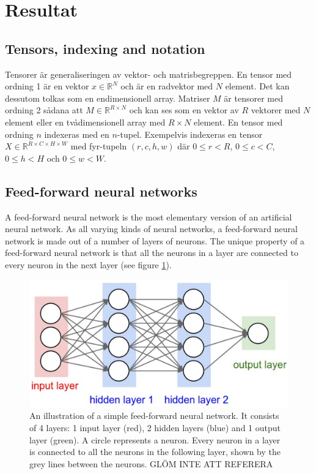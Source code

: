 \documentclass[a4paper,11pt,twoside]{article}
\begin{document}
\newpage
\section{Resultat}


\subsection{Tensors, indexing and notation}
Tensorer är generaliseringen av vektor- och matrisbegreppen. En tensor med ordning 1 är en vektor $x \in \mathbb{R}^N$ och är en radvektor med $N$ element. Det kan dessutom tolkas som en endimensionell array. Matriser $M$ är tensorer med ordning 2 sådana att $M \in \mathbb{R}^{R \times N}$ och kan ses som en vektor av $R$ vektorer med $N$ element eller en tvådimensionell array med $R \times N$ element. En tensor med ordning $n$ indexeras med en $n$-tupel. Exempelvis indexeras en tensor $X \in \mathbb{R}^{R \times C \times H \times W}$ med fyr-tupeln $(r,c,h,w)$ där $0 \leq r < R$, $0 \leq c < C$, $0 \leq h < H$ och $0 \leq w < W$. \cite{cs231n}


\subsection{Feed-forward neural networks}
A feed-forward neural network is the most elementary version of an artificial neural network. As all varying kinds of neural networks, a feed-forward neural network is made out of a number of layers of neurons. The unique property of a feed-forward neural network is that all the neurons in a layer are connected to every neuron in the next layer (see figure \ref{figfeedforward}). \cite{cs231n}

\begin{figure}[h]
	\centering
  		\includegraphics[scale=1]{feedforward.png}
  	\caption{An illustration of a simple feed-forward neural network. It consists of 4 layers: 1 input layer (red), 2 hidden layers (blue) and 1 output layer (green). A circle represents a neuron. Every neuron in a layer is connected to all the neurons in the following layer, shown by the grey lines between the neurons. GLÖM INTE ATT REFERERA} \label{figfeedforward}
\end{figure}
\end{document}
